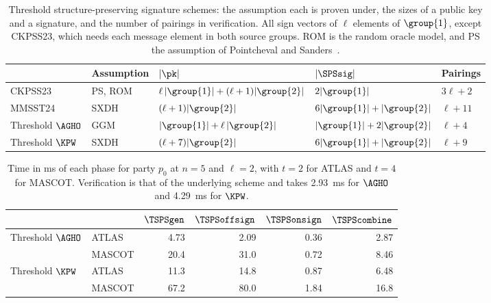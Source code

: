 \begin{table}[htbp] \centering \small \setlength{\tabcolsep}{3pt}
\begin{tabular}{l l l l l}
\toprule
 & Assumption & $|\pk|$ & $|\SPSsig|$ & Pairings \\
\midrule
CKPSS23~\cite{AC:CKPSS23} & PS, ROM & $\ell\,|\group{1}| + (\ell+1)|\group{2}|$ & $2|\group{1}|$ & $3\ell+2$ \\
MMSST24~\cite{PKC:MMSST24} & SXDH & $(\ell+1)|\group{2}|$ & $6|\group{1}| + |\group{2}|$ & $\ell+11$ \\
Threshold $\AGHO$ & GGM & $|\group{1}| + \ell\,|\group{2}|$ & $|\group{1}| + 2|\group{2}|$ & $\ell+4$ \\
Threshold $\KPW$ & SXDH & $(\ell+7)|\group{2}|$ & $6|\group{1}| + |\group{2}|$ & $\ell+9$ \\
\bottomrule
\end{tabular}
\caption[Comparison of threshold SPS schemes]{Threshold structure-preserving
signature schemes: the assumption each is proven under, the sizes of a public key
and a signature, and the number of pairings in verification. All sign vectors of
$\ell$ elements of $\group{1}$, except CKPSS23, which needs
each message element in both source groups. ROM is the random oracle model, and
PS the assumption of Pointcheval and Sanders~\cite{RSA:PoiSan16}.}
\label{tab:tsps-comp} \end{table}

\begin{table}[htbp] \centering \small \begin{tabular}{l l r r r r}
\toprule
 & & $\TSPSgen$ & $\TSPSoffsign$ & $\TSPSonsign$ & $\TSPScombine$ \\
\midrule
Threshold $\AGHO$ & ATLAS & 4.73 & 2.09 & 0.36 & 2.87 \\
 & MASCOT & 20.4 & 31.0 & 0.72 & 8.46 \\
Threshold $\KPW$ & ATLAS & 11.3 & 14.8 & 0.87 & 6.48 \\
 & MASCOT & 67.2 & 80.0 & 1.84 & 16.8 \\
\bottomrule
\end{tabular}
\caption[Threshold SPS schemes: time of every phase]{Time in ms of each phase
for party $p_0$ at $n = 5$ and $\ell = 2$, with $t = 2$ for ATLAS and $t = 4$ for
MASCOT. Verification is that of the underlying scheme and takes 2.93~ms for
$\AGHO$ and 4.29~ms for $\KPW$.} \label{tab:tsps-benchmarks} \end{table}

